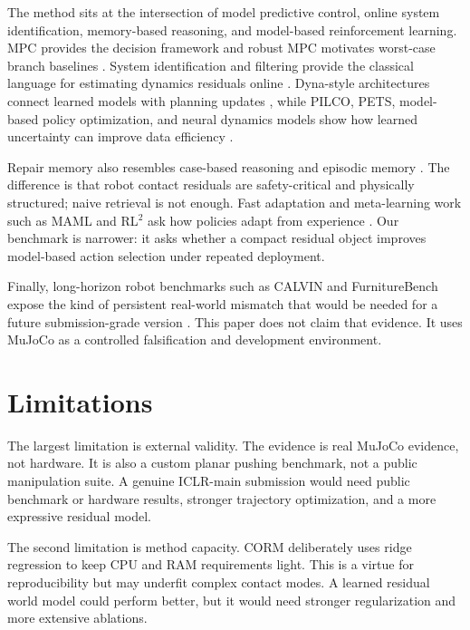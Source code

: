 \documentclass{article}
\begin{document}
The method sits at the intersection of model predictive control, online system identification, memory-based reasoning, and model-based reinforcement learning. MPC provides the decision framework and robust MPC motivates worst-case branch baselines \citep{mayne2000mpc,bemporad1999robust,mayne2005robust}. System identification and filtering provide the classical language for estimating dynamics residuals online \citep{ljung1999system,anderson1979optimal}. Dyna-style architectures connect learned models with planning updates \citep{sutton1991dyna}, while PILCO, PETS, model-based policy optimization, and neural dynamics models show how learned uncertainty can improve data efficiency \citep{deisenroth2011pilco,chua2018pets,janner2019mbpo,nagabandi2018neural}.

Repair memory also resembles case-based reasoning and episodic memory \citep{aamodt1994case,pmlr-v80-santoro18a}. The difference is that robot contact residuals are safety-critical and physically structured; naive retrieval is not enough. Fast adaptation and meta-learning work such as MAML and RL$^2$ ask how policies adapt from experience \citep{finn2017maml,duan2016rl2}. Our benchmark is narrower: it asks whether a compact residual object improves model-based action selection under repeated deployment.

Finally, long-horizon robot benchmarks such as CALVIN and FurnitureBench expose the kind of persistent real-world mismatch that would be needed for a future submission-grade version \citep{mees2022calvin,heo2025furniturebench}. This paper does not claim that evidence. It uses MuJoCo as a controlled falsification and development environment.

\section{Limitations}

The largest limitation is external validity. The evidence is real MuJoCo evidence, not hardware. It is also a custom planar pushing benchmark, not a public manipulation suite. A genuine ICLR-main submission would need public benchmark or hardware results, stronger trajectory optimization, and a more expressive residual model.

The second limitation is method capacity. CORM deliberately uses ridge regression to keep CPU and RAM requirements light. This is a virtue for reproducibility but may underfit complex contact modes. A learned residual world model could perform better, but it would need stronger regularization and more extensive ablations.
\end{document}
